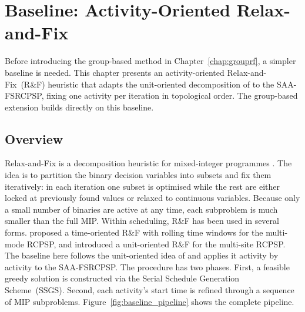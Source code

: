 \chapter{Baseline: Activity-Oriented Relax-and-Fix}
\label{chap:baseline}
Before introducing the group-based method in
Chapter~\ref{chap:grouprf}, a simpler baseline is needed. This
chapter presents an activity-oriented Relax-and-Fix~(R\&F)
heuristic that adapts the unit-oriented decomposition of
\cite{franz2019fixoptimize} to the SAA-FSRCPSP, fixing one
activity per iteration in topological order. The group-based
extension builds directly on this baseline.

\section{Overview}
\label{sec:baseline_overview}
Relax-and-Fix is a decomposition heuristic for mixed-integer
programmes \parencite{pochet2006,Helber2010}. The idea is to
partition the binary decision variables into subsets and fix them
iteratively: in each iteration one subset is optimised while the
rest are either locked at previously found values or relaxed to
continuous variables. Because only a small number of binaries are
active at any time, each subproblem is much smaller than the full
MIP.
Within scheduling, R\&F has been used in several forms.
\cite{etminaniesfahani2024relaxsolve} proposed a time-oriented
R\&F with rolling time windows for the multi-mode RCPSP, and
\cite{bigler2024multisite} introduced a unit-oriented R\&F for
the multi-site RCPSP. The baseline here follows the unit-oriented
idea of \cite{franz2019fixoptimize} and applies it activity by
activity to the SAA-FSRCPSP.
The procedure has two phases. First, a feasible greedy solution is
constructed via the Serial Schedule Generation Scheme~(SSGS).
Second, each activity's start time is refined through a sequence of
MIP subproblems. Figure~\ref{fig:baseline_pipeline} shows the
complete pipeline.
